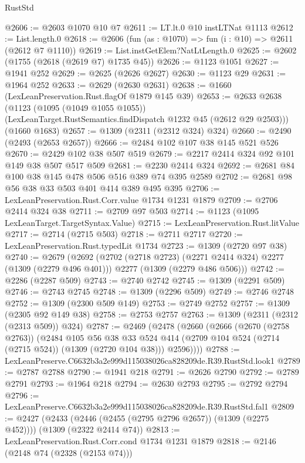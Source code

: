 \begin{lexlean}{RustStd}
\begin{coremodule}
@2606 := @2603 @1070 @10 @7
@2611 := LT.lt.{0} @10 instLTNat @1113
@2612 := List.length.{0}
@2618 := @2606 (fun (as : @1070) => fun (i : @10) => @2611 (@2612 @7 @1110))
@2619 := List.instGetElem?NatLtLength.{0}
@2625 := @2602 (@1755 (@2618 (@2619 @7) @1735 @45))
@2626 := @1123 @1051
@2627 := @1941 @252
@2629 := @2625 (@2626 @2627)
@2630 := @1123 @29
@2631 := @1964 @252
@2633 := @2629 (@2630 @2631)
@2638 := @1660 (LexLeanPreservation.Rust.flagOf @1879 @145 @39)
@2653 := @2633
    @2638
    (@1123
      (@1095 (@1049 @1055 @1055))
      (LexLeanTarget.RustSemantics.findDispatch @1232 @45 (@2612 @29 @2503)))
    (@1660 @1683)
@2657 := @1309 (@2311 (@2312 @324) @324)
@2660 := @2490 (@2493 (@2653 @2657))
@2666 := @2484 @102 @107 @38 @145 @521 @526
@2670 := @2429 @102 @38 @507 @519
@2679 := @2217 @2414 @324 @92 @101 @149 @38 @507 @517 @509
@2681 := @2230 @2414 @324
@2692 := @2681 @84 @100 @38 @145 @478 @506 @516 @389 @74 @395 @2589
@2702 := @2681 @98 @56 @38 @33 @503 @401 @414 @389 @495 @395
@2706 := LexLeanPreservation.Rust.Corr.value @1734 @1231 @1879
@2709 := @2706 @2414 @324 @38
@2711 := @2709 @97 @503
@2714 := @1123 (@1095 LexLeanTarget.TargetSyntax.Value)
@2715 := LexLeanPreservation.Rust.litValue
@2717 := @2714 (@2715 @503)
@2718 := @2711 @2717
@2720 := LexLeanPreservation.Rust.typedLit @1734
@2723 := @1309 (@2720 @97 @38)
@2740 := @2679
    (@2692
      (@2702 (@2718 @2723) (@2271 @2414 @324) @2277 (@1309 (@2279 @496 @401)))
      @2277
      (@1309 (@2279 @486 @506)))
@2742 := @2286 (@2287 @509)
@2743 := @2740 @2742
@2745 := @1309 (@2291 @509)
@2746 := @2743 @2745
@2748 := @1309 (@2296 @509)
@2749 := @2746 @2748
@2752 := @1309 (@2300 @509 @149)
@2753 := @2749 @2752
@2757 := @1309 (@2305 @92 @149 @38)
@2758 := @2753 @2757
@2763 := @1309 (@2311 (@2312 (@2313 @509)) @324)
@2787 := @2469
    (@2478
      (@2660
        (@2666
          (@2670 (@2758 @2763))
          (@2484
            @105
            @56
            @38
            @33
            @524
            @414
            (@2709 @104 @524 (@2714 (@2715 @524)) (@1309 (@2720 @104 @38)))
            @2596))))
@2788 := LexLeanPreserve.C6632b3a2e999d115038026ca828209de.R39.RustStd.look1
@2789 := @2787 @2788
@2790 := @1941 @218
@2791 := @2626 @2790
@2792 := @2789 @2791
@2793 := @1964 @218
@2794 := @2630 @2793
@2795 := @2792 @2794
@2796 := LexLeanPreserve.C6632b3a2e999d115038026ca828209de.R39.RustStd.fal1
@2809 := @2427
    (@2433 (@2446 (@2455 (@2795 @2796 @2657)) (@1309 (@2275 @452))))
    (@1309 (@2322 @2414 @74))
@2813 := LexLeanPreservation.Rust.Corr.cond @1734 @1231 @1879
@2818 := @2146 (@2148 @74 (@2328 (@2153 @74)))

\end{coremodule}
\end{lexlean}
